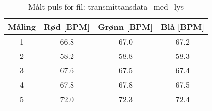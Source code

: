 
\begin{table}[H]
\centering
\caption{Målt puls for fil: transmittansdata\_med\_lys}
\label{tab:transmittansdata\_med\_lys}
\begin{tabular}{|c|c|c|c|}
\hline
\textbf{Måling} & \textbf{Rød [BPM]} & \textbf{Grønn [BPM]} & \textbf{Blå [BPM]} \\ \hline
1 & 66.8 & 67.0 & 67.2 \\ \hline
2 & 58.2 & 58.8 & 58.3 \\ \hline
3 & 67.6 & 67.5 & 67.4 \\ \hline
4 & 67.8 & 67.8 & 67.5 \\ \hline
5 & 72.0 & 72.3 & 72.4 \\ \hline
\end{tabular}
\end{table}
